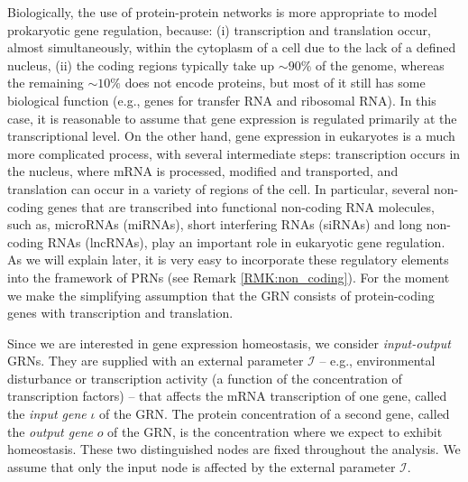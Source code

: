 \documentclass[a4paper,fleqn]{cas-dc}
\newcommand{\II}{{\mathcal I}}
\begin{document}
Biologically, the use of protein-protein networks is more appropriate to model prokaryotic gene regulation, because: (i) transcription and translation occur, almost simultaneously, within the cytoplasm of a cell due to the lack of a defined nucleus, (ii) the coding regions typically take up $\sim 90\%$ of the genome, whereas the remaining $\sim 10\%$ does not encode proteins, but most of it still has some biological function (e.g., genes for transfer RNA and ribosomal RNA).
In this case, it is reasonable to assume that gene expression is regulated primarily at the transcriptional level.
On the other hand, gene expression in eukaryotes is a much more complicated process, with several intermediate steps: transcription occurs in the nucleus, where mRNA is processed, modified and transported, and translation can occur in a variety of regions of the cell.
In particular, several non-coding genes that are transcribed into functional non-coding RNA molecules, such as, microRNAs (miRNAs), short interfering RNAs (siRNAs) and long non-coding RNAs (lncRNAs), play an important role in eukaryotic gene regulation.
As we will explain later, it is very easy to incorporate these regulatory elements into the framework of PRNs (see Remark \ref{RMK:non_coding}).
For the moment we make the simplifying assumption that the GRN consists of protein-coding genes with transcription and translation.

Since we are interested in gene expression homeostasis, we consider {\em input-output} GRNs. 
They are supplied with an external parameter $\II$ -- e.g., environmental disturbance or transcription activity (a function of the concentration of transcription factors) -- that affects the mRNA transcription of one gene, called the {\em input gene} $\iota$ of the GRN.
The protein concentration of a second gene, called the {\em output gene} $o$ of the GRN, is the concentration where we expect to exhibit homeostasis.
These two distinguished nodes are fixed throughout the analysis.
We assume that only the input node is affected by the external parameter $\II$.
\end{document}
